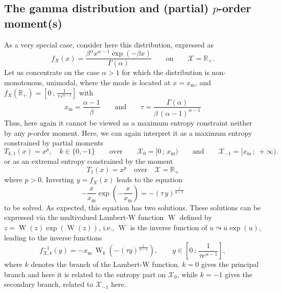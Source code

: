 \documentclass[english,sort&compress]{elsarticle}
\theoremstyle{definition}
\theoremstyle{plain}
\theoremstyle{plain}
\def\Rset{\mathbb{R}}
\def\X{\mathcal{X}}
\def\W{\operatorname{W}}
\begin{document}

\subsection{The gamma distribution and (partial) $p$-order moment(s)}

\label{subsec:GammaFirstOrder}

As a very special case, consider here this distribution, expressed
as
%
\[
f_X(x) = \frac{\beta^\alpha  x^{\alpha-1} \exp(-\beta x)}{\Gamma(\alpha)} \qquad
\mbox{on} \qquad \X = \Rset_+.
\]
%
Let  us concentrate  on the  case $\alpha  > 1$  for which  the  distribution is
non-monotonous, unimodal, where the mode is located at $x = x_{\mathrm{m}}$, and
$f_X(\Rset_+) = \left[ 0 \, ; \, \frac1{\tau \,e^{\alpha-1}} \right]$ with
%
\[
x_{\mathrm{m}}  =   \frac{\alpha-1}{\beta}  \qquad  \mbox{and}   \qquad  \tau  =
\frac{\Gamma(\alpha)}{\beta \, (\alpha-1)^{\alpha-1}}
\]
%
Thus, here again it cannot be  viewed as a maximum entropy constraint neither by
any $p$-order  moment.  Here,  we can  again interpret it  as a  maximum entropy
constrained by partial moments
%
\[
T_{k,1}(x) = x^p, \quad k \in \{ 0  , -1 \} \qquad \mbox{over} \qquad \X_0 = [ 0
\, ; \, x_{\mathrm{m}} ) \qquad  \mbox{and} \qquad \X_{-1} = [ x_{\mathrm{m}} \,
; \: +\infty ).
\]
%
or as an extremal entropy constrained by the moment 
%
\[
T_1(x) = x^p \quad \mbox{over} \quad \X = \Rset_+
\]
%
where $p > 0$. Inverting $y = f_X(x)$ leads to the equation
%
\[
-  \frac{x}{x_{\mathrm{m}}} \exp\left(  - \frac{x}{x_{\mathrm{m}}}  \right)  = -
(\tau  \,  y )^{\frac{1}{\alpha -  1}}
\]
%
to be solved. As expected, this  equation has two solutions. These solutions can
be  expressed   via  the   multivalued  Lambert-W   function  $\W$   defined  by
$z=\W(z)\exp(\W(z))$,  i.e., $\W$  is  the  inverse function  of  $u \leadsto  u
\exp(u)$\cite[\S~1]{CorGon96}, leading to the inverse functions
\[
f_{X,k}^{-1}(y) = - x_{\mathrm{m}}  \, \W_k\left( - (\tau y)^{\frac{1}{\alpha
      - 1}} \right), \qquad y \in \left[ 0 \, ; \, \frac{1}{\tau e^{\alpha - 1}}
\right],
\]
%
where  $k$  denotes  the branch  of  the  Lambert-W  function. $k=0$  gives  the
principal branch and here it is related  to the entropy part on $\X_0$, while $k
= -1$ gives the secondary branch, related to $\X_{-1}$ here.
\end{document}
